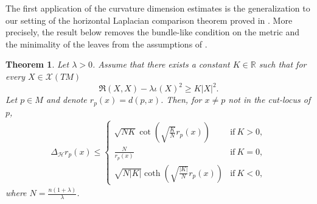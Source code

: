 \documentclass[11pt]{article}
\numberwithin{equation}{section}
\newtheorem{theorem}{Theorem}[section]
\newcommand{\Ho}{\mathcal H}
\begin{document}
    The first application of the curvature dimension estimates is the generalization to our setting of the horizontal Laplacian comparison theorem proved in \cite{2025arXiv250913276B}. More precisely, the result below removes the bundle-like condition on the metric and the minimality of the leaves from the assumptions of  \cite{2025arXiv250913276B}.

\begin{theorem}\label{Comparison horizontal Laplacian}
Let $\lambda >0 $. Assume that there exists a constant $K \in \mathbb{R}$ such that for every $X\in \mathcal{X}(TM)$
        \[
        \mathfrak{R} (X,X) -\lambda \iota (X)^2 \ge K | X|^2.
        \]
        Let $p \in M$ and denote $r_p(x)=d(p,x)$. Then, for $x\neq p$ not in the  cut-locus of $p$,
\begin{align*}
\Delta_\Ho r_p (x) \le 
\begin{cases}
 \sqrt { NK} \cot\left(\sqrt { \frac{K}{N}} r_p(x) \right) &\text{if}\ K>0,
\\
\displaystyle\frac{N}{r_p(x)} &\text{if}\ K = 0,
\\
 \sqrt{N |K|} \coth\left(\sqrt{\frac{|K|}{N}} r_p(x)\right) &\text{if}\ K<0,
\end{cases}
\end{align*}
where $N=\frac{n(1+\lambda)}{\lambda}$.
\end{theorem}
\end{document}
